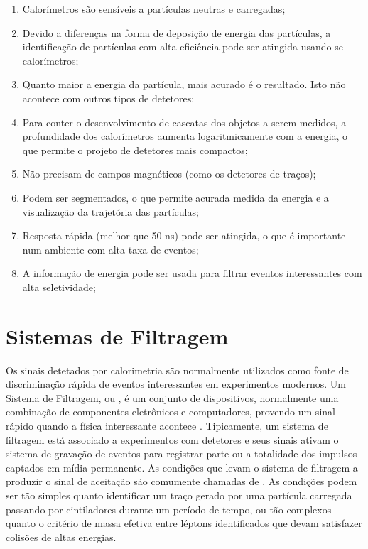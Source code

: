 \begin{enumerate}
\item Calorímetros são sensíveis a partículas neutras e carregadas;

\item Devido a diferenças na forma de deposição de energia das partículas, a
identificação de partículas com alta eficiência pode ser atingida usando-se
calorímetros;

\item Quanto maior a energia da partícula, mais acurado é o resultado. Isto não
acontece com outros tipos de detetores;

\item Para conter o desenvolvimento de cascatas dos objetos a serem medidos, a
profundidade dos calorímetros aumenta logaritmicamente com a energia, o que
permite o projeto de detetores mais compactos;

\item Não precisam de campos magnéticos (como os detetores de traços);

\item Podem ser segmentados, o que permite acurada medida da energia e a
visualização da tra\-je\-tó\-ria das par\-tí\-cu\-las;

\item Resposta rápida (melhor que 50 ns) pode ser atingida, o que é importante
num ambiente com alta taxa de eventos;

\item A informação de energia pode ser usada para filtrar eventos interessantes
com alta seletividade;
\end{enumerate}

\section{Sistemas de Filtragem}
\label{sec:trigger}

Os sinais detetados por calorimetria são normalmente utilizados como fonte de
discriminação rápida de eventos interessantes em experimentos modernos. Um
Sistema de Filtragem, ou , é um conjunto de dispositivos,
normalmente uma combinação de componentes eletrônicos e computadores, provendo
um sinal rápido quando a física interessante acontece
\cite{bock:detector, cms-trigger, d0-trigger, d0-trigger2, hlt-tdr,
trig-review}. Tipicamente, um sistema de filtragem está associado a
experimentos com detetores e seus sinais ativam o sistema de gravação de
eventos para registrar parte ou a totalidade dos impulsos captados em mídia
permanente. As condições que levam o sistema de filtragem a produzir o sinal
de aceitação são comumente chamadas de
. As condições podem ser tão simples quanto
identificar um traço gerado por uma partícula carregada passando por
cintiladores durante um período de tempo, ou tão complexos quanto o critério
de massa efetiva entre léptons identificados que devam satisfazer colisões de
altas energias.

